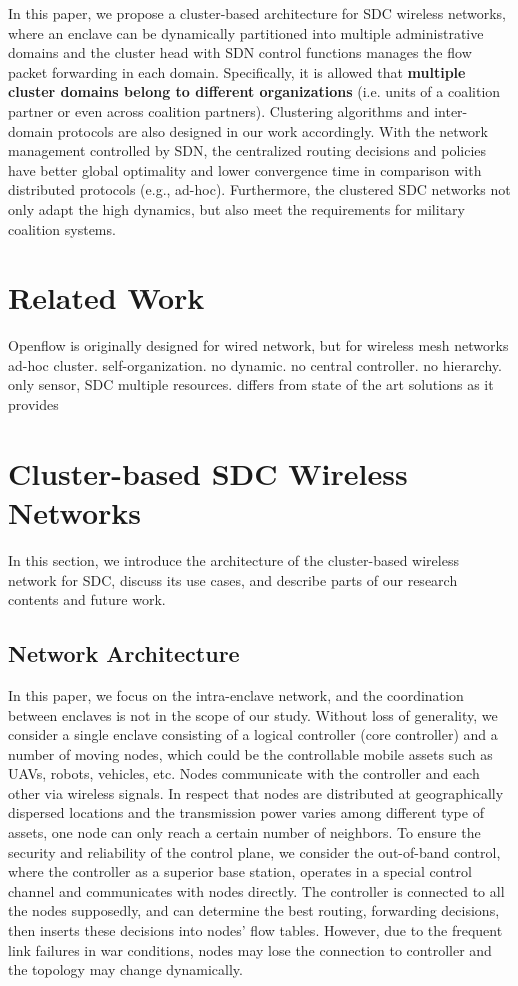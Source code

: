 \documentclass[conference]{IEEEtran}
\begin{document}
In this paper, we propose a cluster-based architecture for SDC wireless networks, where an enclave can be dynamically partitioned into multiple administrative domains and the cluster head with SDN control functions manages the flow packet forwarding in each domain. Specifically, it is allowed that \textbf{multiple cluster domains belong to different organizations} (i.e. units of a coalition partner or even across coalition partners). Clustering algorithms and inter-domain protocols are also designed in our work accordingly. With the network management controlled by SDN, the centralized routing decisions and policies have better global optimality and lower convergence time in comparison with distributed protocols (e.g., ad-hoc). Furthermore, the clustered SDC networks not only adapt the high dynamics, but also meet the requirements for military coalition systems.
\section{Related Work}
Openflow is originally designed for wired network, but for wireless mesh networks
ad-hoc cluster. self-organization.  no dynamic. no central controller. no hierarchy. only sensor, SDC multiple resources.
differs from state of the art solutions as it provides
\section{Cluster-based SDC Wireless Networks}
\label{s2}
In this section, we introduce the architecture of the cluster-based wireless network for SDC, discuss its use cases, and describe parts of our research contents and future work.
\subsection{Network Architecture}
In this paper, we focus on the intra-enclave network, and the coordination between enclaves is not in the scope of our study. Without loss of generality, we consider a single enclave consisting of a logical controller (core controller) and a number of moving nodes, which could be the controllable mobile assets such as UAVs, robots, vehicles, etc. Nodes communicate with the controller and each other via wireless signals. In respect that nodes are distributed at geographically dispersed locations and the transmission power varies among different type of assets, one node can only reach a certain number of neighbors. To ensure the security and reliability of the control plane, we consider the out-of-band control, where the controller as a superior base station, operates in a special control channel and communicates with nodes directly. The controller is connected to all the nodes supposedly, and can determine the best routing, forwarding decisions, then inserts these decisions into nodes' flow tables. However, due to the frequent link failures in war conditions, nodes may lose the connection to controller and the topology may change dynamically.
\end{document}

